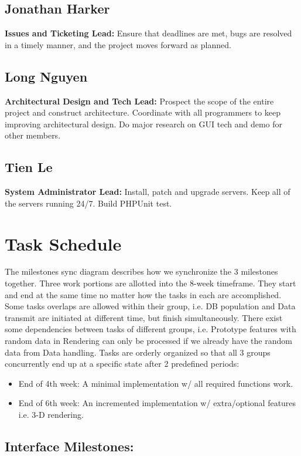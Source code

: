 \documentclass[12pt, letterpaper]{article}
\begin{document}
  \subsection{Jonathan Harker}
  {\bf Issues and Ticketing Lead:} Ensure that deadlines are met, bugs are resolved in a timely manner, and the project moves forward as planned.
  \subsection{Long Nguyen}
  {\bf Architectural Design and Tech Lead:} Prospect the scope of the entire project and construct architecture. Coordinate with all programmers to keep improving architectural design. Do major research on GUI tech and demo for other members.
  \subsection{Tien Le}
  {\bf System Administrator Lead:} Install, patch and upgrade servers. Keep all of the servers running 24/7. Build PHPUnit test.

\section{Task Schedule}

The milestones sync diagram describes how we synchronize the 3 milestones together. Three work portions are allotted into the 8-week timeframe. They start and end at the same time no matter how the tasks in each are accomplished. Some tasks overlaps are allowed within their group, i.e. DB population and Data transmit are initiated at different time, but finish simultaneously. There exist some dependencies between tasks of different groups, i.e. Prototype features with random data in Rendering can only be processed if we already have the random data from Data handling. Tasks are orderly organized so that all 3 groups concurrently end up at a specific state after 2 predefined periods:
  \begin{itemize}
    \item End of 4th week:  A minimal implementation w/ all required functions work.
    \item End of 6th week: An incremented implementation w/ extra/optional features i.e. 3-D rendering.
  \end{itemize}
  \subsection{Interface Milestones:}
	
\end{document}
